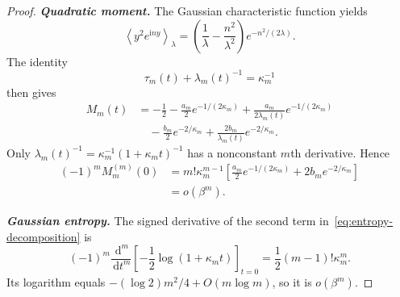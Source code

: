 \documentclass[10pt,letterpaper,journal]{IEEEtran}
\newcommand{\dd}{\,\mathrm{d}}
\newcommand{\ii}{\mathrm{i}}
\newcommand{\avgG}[2]{\left\langle #1\right\rangle_{#2}}
\theoremstyle{plain}
\theoremstyle{definition}
\begin{document}
\begin{proof}
\textbf{\textit{Quadratic moment.}}
The Gaussian characteristic function yields
\[
 \avgG{y^2e^{\ii ny}}{\lambda}
 =\left(\frac1\lambda-\frac{n^2}{\lambda^2}\right)
 e^{-n^2/(2\lambda)}.
\]
The identity
\begin{equation}
 \tau_m(t)+\lambda_m(t)^{-1}=\kappa_m^{-1}
 \label{eq:conservation}
\end{equation}
then gives
\begin{equation}
 \begin{aligned}
 M_m(t)&=-\frac12-\frac{a_m}{2}e^{-1/(2\kappa_m)}
 +\frac{a_m}{2\lambda_m(t)}e^{-1/(2\kappa_m)}\\
 &\quad-\frac{b_m}{2}e^{-2/\kappa_m}
 +\frac{2b_m}{\lambda_m(t)}e^{-2/\kappa_m}.
 \end{aligned}
 \label{eq:moment-explicit}
\end{equation}
Only $\lambda_m(t)^{-1}=\kappa_m^{-1}(1+\kappa_mt)^{-1}$ has a
nonconstant $m$th derivative. Hence
\begin{equation}
 \begin{aligned}
 (-1)^mM_m^{(m)}(0)
 &=m!\kappa_m^{m-1}
 \left[\frac{a_m}{2}e^{-1/(2\kappa_m)}
 +2b_me^{-2/\kappa_m}\right]\\
 &=o(\beta^m).
 \end{aligned}
 \label{eq:moment-small}
\end{equation}

\textbf{\textit{Gaussian entropy.}}
The signed derivative of the second term in~\eqref{eq:entropy-decomposition}
is
\begin{equation}
 (-1)^m\frac{\dd^m}{\dd t^m}
 \left[-\frac12\log(1+\kappa_mt)\right]_{t=0}
 =\frac12(m-1)!\kappa_m^m.
 \label{eq:gaussian-small}
\end{equation}
Its logarithm equals $-(\log2)m^2/4+O(m\log m)$, so it is
$o(\beta^m)$.


\end{proof}
\end{document}
